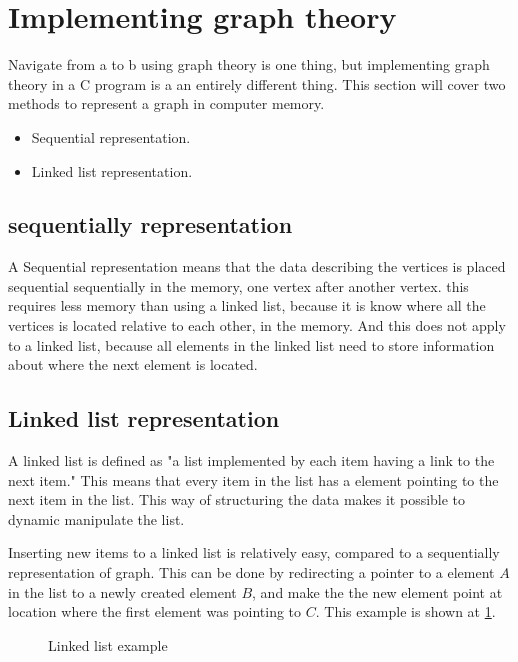 \section{Implementing graph theory}

Navigate from a to b using graph theory is one thing, 
but implementing graph theory in a C program is a an entirely different thing. This section will cover two methods to represent a graph in computer memory. 

\begin{itemize}
	\item Sequential representation.
	\item Linked list representation.
\end{itemize} 

\subsection{sequentially representation}
A Sequential representation means that the data describing the vertices is placed sequential sequentially in the memory, one vertex after another vertex. 
this requires less memory than using a linked list, because it is know where all the vertices is located relative to each other, in the memory. And this does not apply to a linked list, because all elements in the linked list need to store information about where the next element is located.


\subsection{Linked list representation}
A linked list is defined as "a list implemented by each item having a link to the next item."\cite{linked_list_def}
This means that every item in the list has a element pointing to the next item in the list. This way of structuring the data makes it possible to dynamic manipulate the list.\cite{Linked_List}

Inserting new items to a linked list is relatively easy, compared to a sequentially representation of graph. 
This can be done by redirecting a pointer to a element $A$ in the list to a newly created element $B$, and make the the new element point at location where the first element was pointing to $C$. This example is shown at \cref{fig:link}.


\begin{figure}[h]
 \centering
{}
\caption{Linked list example} \label{fig:link}
\end{figure}

